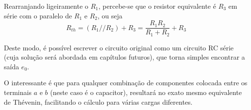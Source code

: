 \documentclass{article}
\numberwithin{equation}{section}
\newlength\Colsep
\let\dfr\dfrac
\begin{document}
\noindent\begin{minipage}{\textwidth}
\begin{minipage}[c][4cm][c]{\dimexpr0.5\textwidth-0.5\Colsep\relax}
    \begin{center}
    \end{center}
\end{minipage}
\begin{minipage}[c][4cm][c]{\dimexpr0.5\textwidth-0.5\Colsep\relax}
    Rearranjando ligeiramente o $R_1$, percebe-se que o resistor equivalente é $R_3$ em série com o paralelo de $R_1$ e $R_2$, ou seja
    $$R_{th}=(R_1//R_2)+R_3=\frac{R_1R_2}{R_1+R_2}+R_3$$
\end{minipage}
\end{minipage}

\noindent\begin{minipage}{\textwidth}
\begin{minipage}[c][4cm][c]{\dimexpr0.5\textwidth-0.5\Colsep\relax}
    \begin{center}
    \end{center}
\end{minipage}
\begin{minipage}[c][4cm][c]{\dimexpr0.5\textwidth-0.5\Colsep\relax}
    Deste modo, é possível escrever o circuito original como um circuito RC série (cuja solução será abordada em capítulos futuros), que torna simples encontrar a saída $e_0$.
\end{minipage}
\end{minipage}

O interessante é que para qualquer combinação de componentes colocada entre os terminais $a$ e $b$ (neste caso é o capacitor), resultará no exato mesmo equivalente de Thévenin, facilitando o cálculo para várias cargas diferentes.
\end{document}
